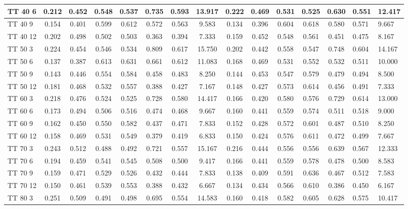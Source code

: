 \documentclass{article}
\begin{document}
\begin{longtable}[c]{|l|c|c|c|c|c|c||c|c|c|c|c|c|}
TT 40  6 & 0.212 & 0.452 & 0.548 & 0.537 & 0.735 & 0.593 & 13.917 & 0.222 & 0.469 & 0.531 & 0.525 & 0.630 & 0.551 & 12.417\\ \hline
TT 40  9 & 0.154 & 0.401 & 0.599 & 0.612 & 0.572 & 0.563 & 9.583 & 0.134 & 0.396 & 0.604 & 0.618 & 0.580 & 0.571 & 9.667\\ \hline
TT 40 12 & 0.202 & 0.498 & 0.502 & 0.503 & 0.363 & 0.394 & 7.333 & 0.159 & 0.452 & 0.548 & 0.561 & 0.451 & 0.475 & 8.167\\ \hline
TT 50  3 & 0.224 & 0.454 & 0.546 & 0.534 & 0.809 & 0.617 & 15.750 & 0.202 & 0.442 & 0.558 & 0.547 & 0.748 & 0.604 & 14.167\\ \hline
TT 50  6 & 0.137 & 0.387 & 0.613 & 0.631 & 0.661 & 0.612 & 11.083 & 0.168 & 0.469 & 0.531 & 0.552 & 0.532 & 0.511 & 10.000\\ \hline
TT 50  9 & 0.143 & 0.446 & 0.554 & 0.584 & 0.458 & 0.483 & 8.250 & 0.144 & 0.453 & 0.547 & 0.579 & 0.479 & 0.494 & 8.500\\ \hline
TT 50 12 & 0.181 & 0.468 & 0.532 & 0.557 & 0.388 & 0.427 & 7.167 & 0.148 & 0.427 & 0.573 & 0.614 & 0.456 & 0.491 & 7.333\\ \hline
TT 60  3 & 0.218 & 0.476 & 0.524 & 0.525 & 0.728 & 0.580 & 14.417 & 0.166 & 0.420 & 0.580 & 0.576 & 0.729 & 0.614 & 13.000\\ \hline
TT 60  6 & 0.173 & 0.494 & 0.506 & 0.516 & 0.474 & 0.468 & 9.667 & 0.160 & 0.441 & 0.559 & 0.574 & 0.511 & 0.518 & 9.000\\ \hline
TT 60  9 & 0.162 & 0.450 & 0.550 & 0.582 & 0.437 & 0.471 & 7.833 & 0.152 & 0.428 & 0.572 & 0.601 & 0.487 & 0.510 & 8.250\\ \hline
TT 60 12 & 0.158 & 0.469 & 0.531 & 0.549 & 0.379 & 0.419 & 6.833 & 0.150 & 0.424 & 0.576 & 0.611 & 0.472 & 0.499 & 7.667\\ \hline
TT 70  3 & 0.243 & 0.512 & 0.488 & 0.492 & 0.721 & 0.557 & 15.167 & 0.216 & 0.444 & 0.556 & 0.556 & 0.639 & 0.567 & 12.333\\ \hline
TT 70  6 & 0.194 & 0.459 & 0.541 & 0.545 & 0.508 & 0.500 & 9.417 & 0.166 & 0.441 & 0.559 & 0.578 & 0.478 & 0.500 & 8.583\\ \hline
TT 70  9 & 0.159 & 0.471 & 0.529 & 0.526 & 0.432 & 0.444 & 7.833 & 0.138 & 0.409 & 0.591 & 0.636 & 0.467 & 0.512 & 7.583\\ \hline
TT 70 12 & 0.150 & 0.461 & 0.539 & 0.553 & 0.388 & 0.432 & 6.667 & 0.134 & 0.434 & 0.566 & 0.610 & 0.386 & 0.450 & 6.167\\ \hline
TT 80  3 & 0.251 & 0.509 & 0.491 & 0.498 & 0.695 & 0.554 & 14.583 & 0.160 & 0.418 & 0.582 & 0.605 & 0.628 & 0.575 & 10.417\\ \hline

\end{longtable}
\end{document}
